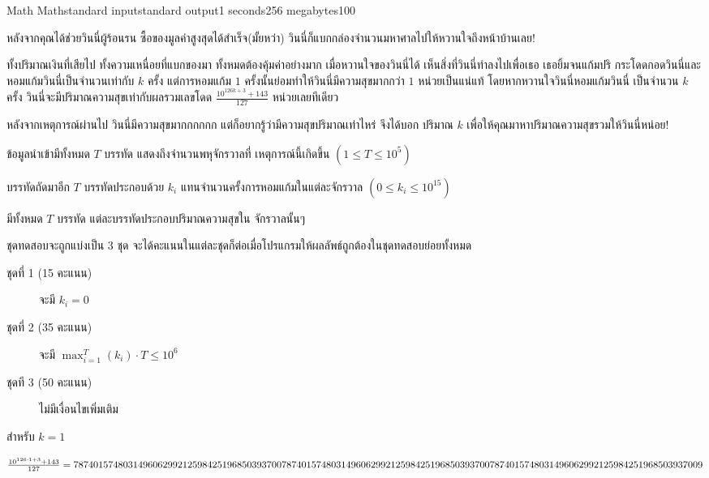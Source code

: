 \documentclass[11pt,a4paper]{article}
\begin{document}
\begin{problem}{Math Math}{standard input}{standard output}{1 seconds}{256 megabytes}{100}

หลังจากคุณได้ช่วยวินนี่ผู้ร้อนรน ซื้อของมูลค่าสูงสุดได้สำเร็จ(มั้ยหว่า) วินนี่ก็แบกกล่องจำนวนมหาศาลไปให้หวานใจถึงหน้าบ้านเลย!

ทั้งปริมาณเงินที่เสียไป ทั้งความเหนื่อยที่แบกของมา ทั้งหมดต้องคุ้มค่าอย่างมาก เมื่อหวานใจของวินนี่ได้ เห็นสิ่งที่วินนี่ทำลงไปเพื่อเธอ
เธอยิ้มจนแก้มปริ กระโดดกอดวินนี่และหอมแก้มวินนี่เป็นจำนวนเท่ากับ $k$ ครั้ง แต่การหอมแก้ม $1$ ครั้งนั้นย่อมทำให้วินนี่มีความสุขมากกว่า $1$ หน่วยเป็นแน่แท้ 
โดยหากหวานใจวินนี่หอมแก้มวินนี่ เป็นจำนวน $k$ ครั้ง วินนี่จะมีปริมาณความสุขเท่ากับผลรวมเลขโดด $\frac{10^{126k + 3} + 143}{127}$ หน่วยเลยทีเดียว

หลังจากเหตุการณ์ผ่านไป วินนี่มีความสุขมากกกกกก แต่ก็อยากรู้ว่ามีความสุขปริมาณเท่าไหร่ จึงได้บอก ปริมาณ $k$ เพื่อให้คุณมาหาปริมาณความสุขรวมให้วินนี่หน่อย!

\InputFile
ข้อมูลนำเข้ามีทั้งหมด $T$ บรรทัด แสดงถึงจำนวนพหุจักรวาลที่ เหตุการณ์นี้เกิดขึ้น $(1 \leq T \leq 10^5)$

บรรทัดถัดมาอีก $T$ บรรทัดประกอบด้วย $k_i$ แทนจำนวนครั้งการหอมแก้มในแต่ละจักรวาล $(0 \leq k_i \leq 10^{15})$ 

\OutputFile
มีทั้งหมด $T$ บรรทัด แต่ละบรรทัดประกอบปริมาณความสุขใน จักรวาลนั้นๆ

\Scoring
ชุดทดสอบจะถูกแบ่งเป็น 3 ชุด จะได้คะแนนในแต่ละชุดก็ต่อเมื่อโปรแกรมให้ผลลัพธ์ถูกต้องในชุดทดสอบย่อยทั้งหมด

\begin{description}

\item[ชุดที่ 1 (15 คะแนน)] จะมี $k_i = 0$

\item[ชุดที่ 2 (35 คะแนน)] จะมี $\max_{i=1}^T(k_i) \cdot T \leq 10^6$

\item[ชุดที 3 (50 คะแนน)] ไม่มีเงื่อนไขเพิ่มเติม

\end{description}

\Examples

\begin{example}
%
\end{example}

\Note

สำหรับ $k = 1$

$\frac{10^{126\cdot1 + 3} + 143}{127} = 787401574803149606299212598425196850393700787401574803149606299212598425\\1968503937007874015748031496062992125984251968503937009$


\end{problem}
\end{document}
